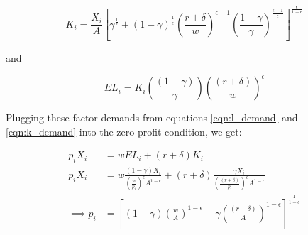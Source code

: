 \documentclass[letterpaper,12pt]{article}
\theoremstyle{definition}
\begin{document}
\begin{spacing}{1.5}
\begin{equation}
\label{eqn:k_demand2}
K_{i} = \frac{X_{i}}{A}\left[\gamma^{\frac{1}{\epsilon}}+(1-\gamma)^{\frac{1}{\epsilon}}\left(\frac{r+\delta}{w}\right)^{\epsilon-1}\left(\frac{1-\gamma}{\gamma}\right)^{\frac{\epsilon-1}{\epsilon}}\right]^{\frac{\epsilon}{1-\epsilon}}
\end{equation}

and

\begin{equation}
\label{eqn:l_demand2}
EL_{i} =K_{i}\left(\frac{(1-\gamma)}{\gamma}\right)\left(\frac{(r+\delta)}{w}\right)^{\epsilon}
\end{equation}


Plugging these factor demands from equations \ref{eqn:l_demand} and \ref{eqn:k_demand} into the zero profit condition, we get:

\begin{equation}
\label{eqn:prices}
\begin{split}
p_{i}X_{i} &= w EL_{i} + (r+\delta)K_{i} \\
p_{i}X_{i} &= w \frac{(1-\gamma)X_{i}}{\left(\frac{w}{p_{i}}\right)^{\epsilon}A^{1-\epsilon}} + (r+\delta)\frac{\gamma X_{i}}{\left(\frac{(r+\delta)}{p_{i}}\right)^{\epsilon}A^{1-\epsilon}} \\
\implies p_{i} & = \left[(1-\gamma)\left(\frac{w}{A}\right)^{1-\epsilon} + \gamma\left(\frac{(r+\delta)}{A}\right)^{1-\epsilon} \right]^{\frac{1}{1-\epsilon}}
\end{split}
\end{equation}



\end{spacing}
\end{document}
